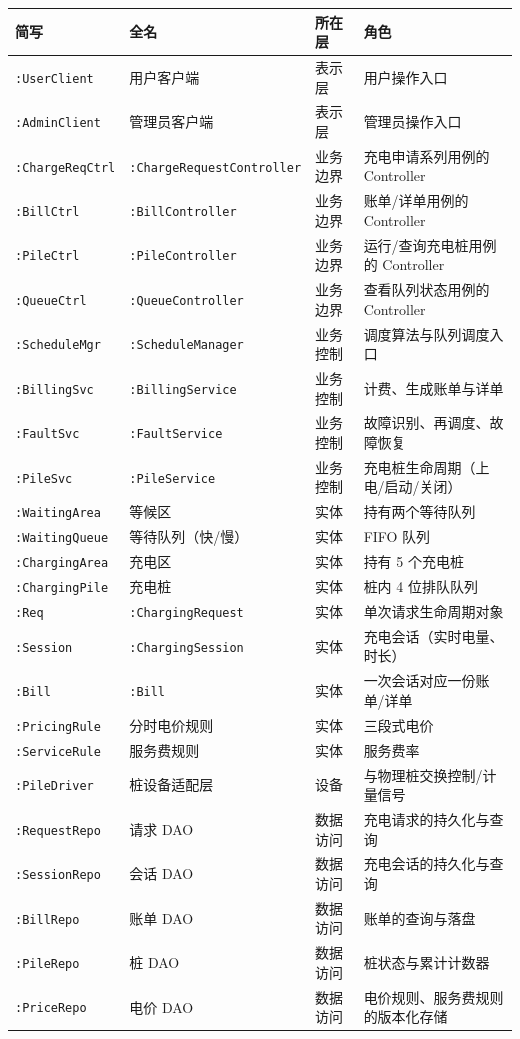 \documentclass[a4paper,11pt]{ctexart}
\begin{document}
\begin{longtable}{p{2.4cm}p{4.4cm}p{2.2cm}p{6cm}}
\toprule
\textbf{简写} & \textbf{全名} & \textbf{所在层} & \textbf{角色} \\
\midrule
\endhead
\texttt{:UserClient} & 用户客户端 & 表示层 & 用户操作入口 \\
\texttt{:AdminClient} & 管理员客户端 & 表示层 & 管理员操作入口 \\
\texttt{:ChargeReqCtrl} & \texttt{:ChargeRequestController} & 业务边界 & 充电申请系列用例的 Controller \\
\texttt{:BillCtrl} & \texttt{:BillController} & 业务边界 & 账单/详单用例的 Controller \\
\texttt{:PileCtrl} & \texttt{:PileController} & 业务边界 & 运行/查询充电桩用例的 Controller \\
\texttt{:QueueCtrl} & \texttt{:QueueController} & 业务边界 & 查看队列状态用例的 Controller \\
\texttt{:ScheduleMgr} & \texttt{:ScheduleManager} & 业务控制 & 调度算法与队列调度入口 \\
\texttt{:BillingSvc} & \texttt{:BillingService} & 业务控制 & 计费、生成账单与详单 \\
\texttt{:FaultSvc} & \texttt{:FaultService} & 业务控制 & 故障识别、再调度、故障恢复 \\
\texttt{:PileSvc} & \texttt{:PileService} & 业务控制 & 充电桩生命周期（上电/启动/关闭） \\
\texttt{:WaitingArea} & 等候区 & 实体 & 持有两个等待队列 \\
\texttt{:WaitingQueue} & 等待队列（快/慢） & 实体 & FIFO 队列 \\
\texttt{:ChargingArea} & 充电区 & 实体 & 持有 5 个充电桩 \\
\texttt{:ChargingPile} & 充电桩 & 实体 & 桩内 4 位排队队列 \\
\texttt{:Req} & \texttt{:ChargingRequest} & 实体 & 单次请求生命周期对象 \\
\texttt{:Session} & \texttt{:ChargingSession} & 实体 & 充电会话（实时电量、时长） \\
\texttt{:Bill} & \texttt{:Bill} & 实体 & 一次会话对应一份账单/详单 \\
\texttt{:PricingRule} & 分时电价规则 & 实体 & 三段式电价 \\
\texttt{:ServiceRule} & 服务费规则 & 实体 & 服务费率 \\
\texttt{:PileDriver} & 桩设备适配层 & 设备 & 与物理桩交换控制/计量信号 \\
\texttt{:RequestRepo} & 请求 DAO & 数据访问 & 充电请求的持久化与查询 \\
\texttt{:SessionRepo} & 会话 DAO & 数据访问 & 充电会话的持久化与查询 \\
\texttt{:BillRepo} & 账单 DAO & 数据访问 & 账单的查询与落盘 \\
\texttt{:PileRepo} & 桩 DAO & 数据访问 & 桩状态与累计计数器 \\
\texttt{:PriceRepo} & 电价 DAO & 数据访问 & 电价规则、服务费规则的版本化存储 \\
\bottomrule
\end{longtable}
\end{document}
